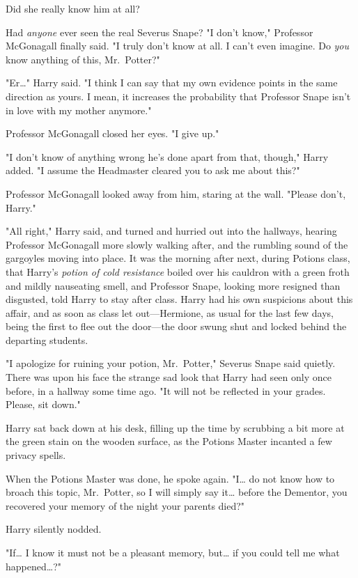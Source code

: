 Did she really know him at all?

Had \emph{anyone} ever seen the real Severus Snape?
\sbreak
"I don't know," Professor McGonagall finally said. "I truly don't know at all. 
I can't even imagine. Do \emph{you} know anything of this, Mr.~Potter?"

"Er{\ldots}" Harry said. "I think I can say that my own evidence points in the 
same direction as yours. I mean, it increases the probability that Professor 
Snape isn't in love with my mother anymore."

Professor McGonagall closed her eyes. "I give up."

"I don't know of anything wrong he's done apart from that, though," Harry 
added. "I assume the Headmaster cleared you to ask me about this?"

Professor McGonagall looked away from him, staring at the wall. "Please don't, 
Harry."

"All right," Harry said, and turned and hurried out into the hallways, hearing 
Professor McGonagall more slowly walking after, and the rumbling sound of the 
gargoyles moving into place.
\sbreak
It was the morning after next, during Potions class, that Harry's \emph{potion 
of cold resistance} boiled over his cauldron with a green froth and mildly 
nauseating smell, and Professor Snape, looking more resigned than disgusted, 
told Harry to stay after class. Harry had his own suspicions about this affair, 
and as soon as class let out---Hermione, as usual for the last few days, being 
the first to flee out the door---the door swung shut and locked behind the 
departing students.

"I apologize for ruining your potion, Mr.~Potter," Severus Snape said quietly. 
There was upon his face the strange sad look that Harry had seen only once 
before, in a hallway some time ago. "It will not be reflected in your grades. 
Please, sit down."

Harry sat back down at his desk, filling up the time by scrubbing a bit more at 
the green stain on the wooden surface, as the Potions Master incanted a few 
privacy spells.

When the Potions Master was done, he spoke again. "I{\ldots} do not know how to 
broach this topic, Mr.~Potter, so I will simply say it{\ldots} before the 
Dementor, you recovered your memory of the night your parents died?"

Harry silently nodded.

"If{\ldots} I know it must not be a pleasant memory, but{\ldots} if you could 
tell me what happened{\ldots}?"

